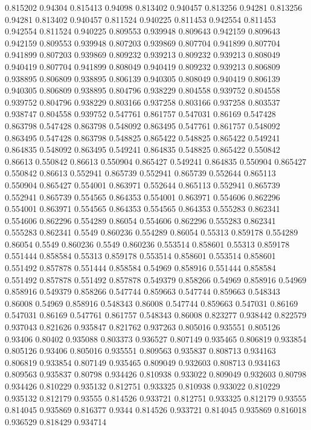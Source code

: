 0.815202 0.94304
0.815413 0.94098
0.813402 0.940457
0.813256 0.94281
0.813256 0.94281
0.813402 0.940457
0.811524 0.940225
0.811453 0.942554
0.811453 0.942554
0.811524 0.940225
0.809553 0.939948
0.809643 0.942159
0.809643 0.942159
0.809553 0.939948
0.807203 0.939869
0.807704 0.941899
0.807704 0.941899
0.807203 0.939869
0.809232 0.939213
0.809232 0.939213
0.808049 0.940419
0.807704 0.941899
0.808049 0.940419
0.809232 0.939213
0.806809 0.938895
0.806809 0.938895
0.806139 0.940305
0.808049 0.940419
0.806139 0.940305
0.806809 0.938895
0.804796 0.938229
0.804558 0.939752
0.804558 0.939752
0.804796 0.938229
0.803166 0.937258
0.803166 0.937258
0.803537 0.938747
0.804558 0.939752
0.547761 0.861757
0.547031 0.86169
0.547428 0.863798
0.547428 0.863798
0.548092 0.863495
0.547761 0.861757
0.548092 0.863495
0.547428 0.863798
0.548825 0.865422
0.548825 0.865422
0.549241 0.864835
0.548092 0.863495
0.549241 0.864835
0.548825 0.865422
0.550842 0.86613
0.550842 0.86613
0.550904 0.865427
0.549241 0.864835
0.550904 0.865427
0.550842 0.86613
0.552941 0.865739
0.552941 0.865739
0.552644 0.865113
0.550904 0.865427
0.554001 0.863971
0.552644 0.865113
0.552941 0.865739
0.552941 0.865739
0.554565 0.864353
0.554001 0.863971
0.554606 0.862296
0.554001 0.863971
0.554565 0.864353
0.554565 0.864353
0.555283 0.862341
0.554606 0.862296
0.554289 0.86054
0.554606 0.862296
0.555283 0.862341
0.555283 0.862341
0.5549 0.860236
0.554289 0.86054
0.55313 0.859178
0.554289 0.86054
0.5549 0.860236
0.5549 0.860236
0.553514 0.858601
0.55313 0.859178
0.551444 0.858584
0.55313 0.859178
0.553514 0.858601
0.553514 0.858601
0.551492 0.857878
0.551444 0.858584
0.54969 0.858916
0.551444 0.858584
0.551492 0.857878
0.551492 0.857878
0.549379 0.858266
0.54969 0.858916
0.54969 0.858916
0.549379 0.858266
0.547744 0.859663
0.547744 0.859663
0.548343 0.86008
0.54969 0.858916
0.548343 0.86008
0.547744 0.859663
0.547031 0.86169
0.547031 0.86169
0.547761 0.861757
0.548343 0.86008
0.823277 0.938442
0.822579 0.937043
0.821626 0.935847
0.821762 0.937263
0.805016 0.935551
0.805126 0.93406
0.80402 0.935088
0.803373 0.936527
0.807149 0.935465
0.806819 0.933854
0.805126 0.93406
0.805016 0.935551
0.809563 0.935837
0.808713 0.934163
0.806819 0.933854
0.807149 0.935465
0.809049 0.932603
0.808713 0.934163
0.809563 0.935837
0.80798 0.934426
0.810938 0.933022
0.809049 0.932603
0.80798 0.934426
0.810229 0.935132
0.812751 0.933325
0.810938 0.933022
0.810229 0.935132
0.812179 0.93555
0.814526 0.933721
0.812751 0.933325
0.812179 0.93555
0.814045 0.935869
0.816377 0.9344
0.814526 0.933721
0.814045 0.935869
0.816018 0.936529
0.818429 0.934714
